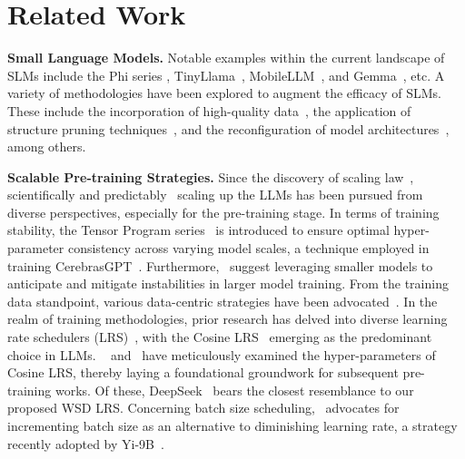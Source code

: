 \vspace{-5mm}
\section{Related Work}
\vspace{-2mm}
\textbf{Small Language Models.} Notable examples within the current landscape of SLMs include the Phi series \citep{gunasekar2023textbooks, li2023textbooks, Javaheripi2023Phi2}, TinyLlama~\citep{zhang2024tinyllama}, MobileLLM~\citep{liu2024mobilellm}, and Gemma~\citep{Banks2024Gemma}, etc. 
A variety of methodologies have been explored to augment the efficacy of SLMs. These include the incorporation of high-quality data~\citep{gunasekar2023textbooks, li2023textbooks, Javaheripi2023Phi2}, the application of structure pruning techniques~\citep{xia2023sheared}, and the reconfiguration of model architectures~\citep{liu2024mobilellm}, among others.

\textbf{Scalable Pre-training Strategies.} Since the discovery of scaling law~\citep{kaplan2020scaling, rae2021scaling, aghajanyan2023scaling}, scientifically and predictably~\citep{achiam2023gpt,hu2023unlock, du2024understanding} scaling up the LLMs has been pursued from diverse perspectives, especially for the pre-training stage. In terms of training stability, the Tensor Program series~\citep{yang2022tensor, yang2023tensor} is introduced to ensure optimal hyper-parameter consistency across varying model scales, a technique employed in training CerebrasGPT~\citep{dey2023cerebras}. Furthermore,~\cite{wortsman2023small} suggest leveraging smaller models to anticipate and mitigate instabilities in larger model training. From the training data standpoint, various data-centric strategies have been advocated~\citep{xie2024doremi, shi2023context, ye2024data}. In the realm of training methodologies, prior research has delved into diverse learning rate schedulers (LRS)~\citep{howard2018universal, raffel2020exploring, hundt2019sharpdarts}, with the Cosine LRS~\citep{loshchilov2016sgdr} emerging as the predominant choice in LLMs. ~\cite{kaplan2020scaling} and~\cite{hoffmann2022training} have meticulously examined the hyper-parameters of Cosine LRS, thereby laying a foundational groundwork for subsequent pre-training works. Of these, DeepSeek~\citep{bi2024deepseek} bears the closest resemblance to our proposed WSD LRS. Concerning batch size scheduling,~\cite{smith2017don} advocates for incrementing batch size as an alternative to diminishing learning rate, a strategy recently adopted by Yi-9B~\citep{young2024yi}.